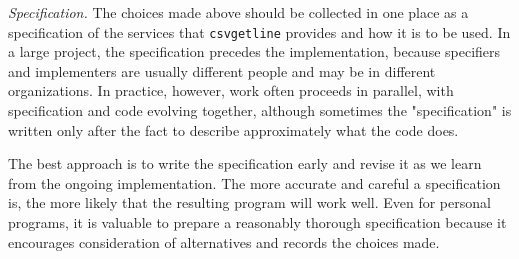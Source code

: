 \emph{Specification.} The choices made above should be collected in one
place as a specification of the services that \verb'csvgetline' provides
and how it is to be used.  In a large project, the specification precedes
the implementation, because specifiers and implementers are usually
different people and may be in different organizations.  In practice,
however, work often proceeds in parallel, with specification and code
evolving together, although sometimes the "specification" is written only
after the fact to describe approximately what the code does.

The best approach is to write the specification early and revise it as we
learn from the ongoing implementation. The more accurate and careful a
specification is, the more likely that the resulting program will work
well. Even for personal programs, it is valuable to prepare a reasonably
thorough specification because it encourages consideration of alternatives
and records the choices made.

